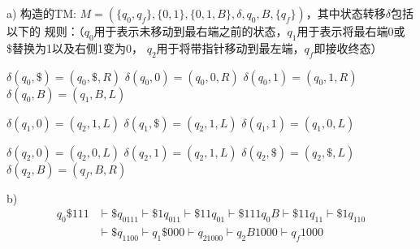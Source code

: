 \begin{solution}
    a)
    构造的TM:
    $M=(\{q_0,q_f\},\{0,1\},\{0,1,B\},\delta,q_0,B,\{q_f\})$，其中状态转移$\delta$包括以下的
    规则：（$q_0$用于表示未移动到最右端之前的状态，$q_1$用于表示将最右端0或\$替换为1以及右侧1变为0，
    $q_2$用于将带指针移动到最左端，$q_f$即接收终态）

    $\delta(q_0,\$)=(q_0,\$,R)$
    $\delta(q_0,0)=(q_0,0,R)$
    $\delta(q_0,1)=(q_0,1,R)$
    $\delta(q_0,B)=(q_1,B,L)$

    $\delta(q_1,0)=(q_2,1,L)$
    $\delta(q_1,\$)=(q_2,1,L)$
    $\delta(q_1,1)=(q_1,0,L)$

    $\delta(q_2,0)=(q_2,0,L)$
    $\delta(q_2,1)=(q_2,1,L)$
    $\delta(q_2,\$)=(q_2,\$,L)$
    $\delta(q_2,B)=(q_f,B,R)$

    b)
    \begin{align*}
        q_0\$111 &\vdash \$q_0111 \vdash \$1q_011 \vdash \$11q_01 \vdash \$111q_0B
        \vdash \$11q_11 \vdash \$1q_110\\
        &\vdash \$q_1100 \vdash q_1\$000 \vdash q_21000 \vdash q_2B1000 \vdash q_f1000
    \end{align*}
\end{solution}